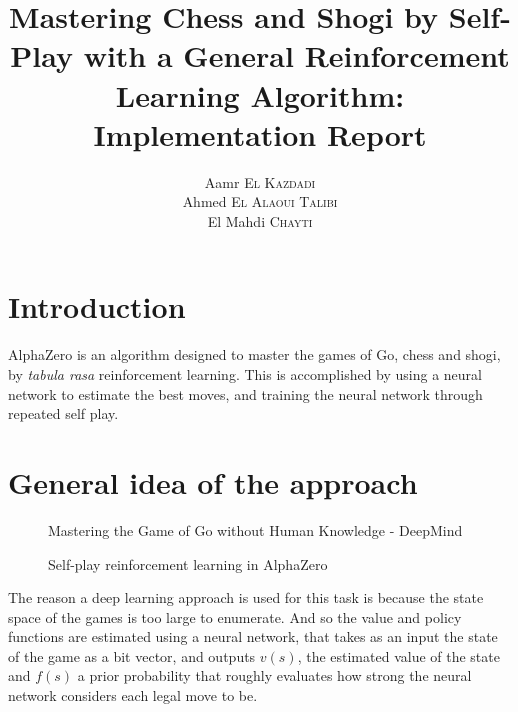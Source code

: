 \documentclass[12pt]{article}
\title{Mastering Chess and Shogi by Self-Play with a General Reinforcement
Learning Algorithm: Implementation Report}
\author{
    Aamr \textsc{El Kazdadi}\\
    Ahmed \textsc{El Alaoui Talibi}\\
    El Mahdi \textsc{Chayti}}
\date{}
\begin{document}
\maketitle

\section{Introduction}
AlphaZero is an algorithm designed to master the games of Go, chess and shogi,
by \textit{tabula rasa} reinforcement learning. This is accomplished by
using a neural network to estimate the best moves, and training the neural
network through repeated self play.

\pagebreak
\section{General idea of the approach}
\begin{figure}[h!]
    \centering
    {\textcopyright Mastering the Game of Go without Human Knowledge - DeepMind}
    \caption{Self-play reinforcement learning in AlphaZero}
\end{figure}

The reason a deep learning approach is used for this task is because the state
space of the games is too large to enumerate. And so the value and policy
functions are estimated using a neural network, that takes as an input the
state of the game as a bit vector, and outputs $v(s)$, the estimated value of
the state and $f(s)$ a prior probability that roughly evaluates how strong the
neural network considers each legal move to be.
\end{document}
